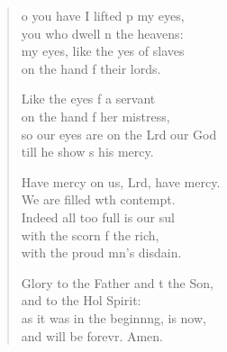 \settowidth{\versewidth}{so our eyes are on the Lord our God *}
\begin{verse}%
  \begin{patverse}
o you have I lifted p my eyes,\Med\\
you who dwell \pointup{\i}n the heavens:\\
my eyes, like the yes of slaves\Med\\
on the hand f their lords.

Like the eyes f a servant\Med\\
on the hand f her mistress,\\
so our eyes are on the Lrd our God\Med\\
till he show s his mercy.

Have mercy on us, Lrd, have mercy.\Med\\
We are filled w\pointup{\i}th contempt.\\
Indeed all too full is our sul\Flex\\
with the scorn f the rich,\Med\\
with the proud mn’s disdain.

Glory to the Father and t the Son,\Med\\
and to the Hol Spirit:\\
as it was in the beginn\pointup{\i}ng, is now,\Med\\
and will be forevr. Amen. 
  \end{patverse}
\end{verse}

